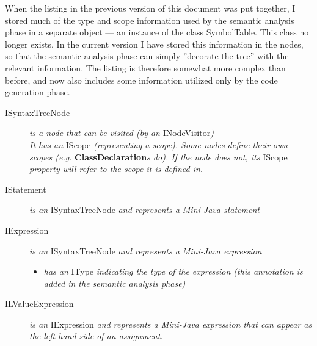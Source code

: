 \documentclass[a4paper,11pt]{article}
\begin{document}
When the listing in the previous version of this document was put together, I stored much of the type and scope information used by the semantic analysis phase in a separate object --- an instance of the class SymbolTable. This class no longer exists. In the current version I have stored this information in the nodes, so that the semantic analysis phase can simply ''decorate the tree'' with the relevant information. The listing is therefore somewhat more complex than before, and now also includes some information utilized only by the code generation phase.

\begin{description}
    \item[ISyntaxTreeNode] \emph{is a node that can be visited (by an} INodeVisitor\emph{)} \\
        \emph{It has an} IScope \emph{(representing a scope). Some nodes define their own scopes (e.g.} \textbf{ClassDeclaration}\emph{s do). If the node does not, its} IScope \emph{property will refer to the scope it is defined in.}
    \item[IStatement] \emph{is an} ISyntaxTreeNode \emph{and represents a Mini-Java statement}
    \item[IExpression] \emph{is an} ISyntaxTreeNode \emph{and represents a Mini-Java expression}
      \begin{itemize}
        \item \emph{has an} IType \emph{indicating the type of the expression (this annotation is added in the semantic analysis phase)}
      \end{itemize}
    \item[ILValueExpression] \emph{is an} IExpression \emph{and represents a Mini-Java expression that can appear as the left-hand side of an assignment.}
\end{description}
\end{document}
